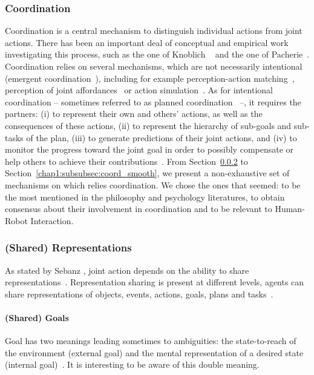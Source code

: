 \documentclass[a4paper,11pt,twoside]{StyleThese}
\begin{document}
\subsubsection{Coordination}
Coordination is a central mechanism to distinguish individual actions from joint actions. There has been an important deal of conceptual and empirical work investigating this process, such as the one of Knoblich \etal~\cite{knoblich_2011_joint} and the one of Pacherie~\cite{pacherie_2012_agency}. Coordination relies on several mechanisms, which are not necessarily intentional (emergent coordination~\cite{knoblich_2011_joint}), including for example perception-action matching~\cite{brass_2001_movement}, perception of joint affordances~\cite{ramenzoni_2008_short} or action simulation~\cite{sebanz_2009_prediction}. As for intentional coordination – sometimes referred to as planned coordination~\cite{knoblich_2011_joint} –, it requires the partners: (i) to represent their own and others' actions, as well as the consequences of these actions, (ii) to represent the hierarchy of sub-goals and sub-tasks of the plan, (iii) to generate predictions of their joint actions, and (iv) to monitor the progress toward the joint goal in order to possibly compensate or help others to achieve their contributions~\cite{pacherie_2012_agency}. From Section~\ref{chap1:subsubsec:shared_rep} to Section~\ref{chap1:subsubsec:coord_smooth}, we present a non-exhaustive set of mechanisms on which relies coordination. We chose the ones that seemed: to be the most mentioned in the philosophy and psychology literatures, to obtain consensus about their involvement in coordination and to be relevant to Human-Robot Interaction. 

\subsubsection{(Shared) Representations}\label{chap1:subsubsec:shared_rep}
As stated by Sebanz \etal, joint action depends on the ability to share representations~\cite{sebanz_2006_joint}. Representation sharing is present at different levels, \ie agents can share representations of objects, events, actions, goals, plans and tasks~\cite{pacherie_2012_agency,vesper_2017_joint}. 

\paragraph{(Shared) Goals}
Goal has two meanings leading sometimes to ambiguities: the state-to-reach of the environment (external goal) and the mental representation of a desired state (internal goal)~\cite{tomasello_2005_understanding}. It is interesting to be aware of this double meaning. 
\end{document}
